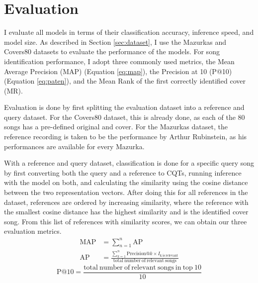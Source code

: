 \documentclass{article}
\begin{document}
\section{Evaluation}\label{sec:eval}
I evaluate all models in terms of their classification accuracy, inference speed, and model size. As described in Section \ref{sec:dataset}, I use the Mazurkas and Covers80 datasets to evaluate the performance of the models. For song identification performance, I adopt three commonly used metrics, the Mean Average Precision (MAP) (Equation \ref{eq:map}), the Precision at 10 (P@10) (Equation \ref{eq:paten}), and the Mean Rank of the first correctly identified cover (MR).

Evaluation is done by first splitting the evaluation dataset into a reference and query dataset. For the Covers80 dataset, this is already done, as each of the 80 songs has a pre-defined original and cover. For the Mazurkas dataset, the reference recording is taken to be the performance by Arthur Rubinstein, as his performances are available for every Mazurka.

With a reference and query dataset, classification is done for a specific query song by first converting both the query and a reference to CQTs, running inference with the model on both, and calculating the similarity using the cosine distance between the two representation vectors. After doing this for all references in the dataset, references are ordered by increasing similarity, where the reference with the smallest cosine distance has the highest similarity and is the identified cover song. From this list of references with similarity scores, we can obtain our three evaluation metrics.
\begin{align}
    \mathrm{MAP} &= \sum_{n=1}^{n}\mathrm{AP}\label{eq:map} \\
    \mathrm{AP} &= \frac{\sum_{k=1}^{n} \mathrm{Precision@}k \times I_{\mathrm{k\ is\ relevant}}}{\mathrm{total\ number\ of\ relevant\ songs}}
\end{align}
\begin{equation}
    \mathrm{P@10} = \frac{\mathrm{total\ number\ of\ relevant\ songs\ in\ top\ 10}}{10}\label{eq:paten}
\end{equation}
\end{document}
